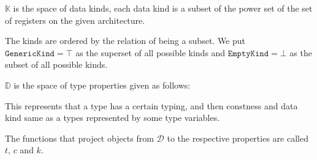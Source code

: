 \begin{defn}
    $\mathbb{K}$ is the space of data kinds, each data kind is a subset of the power set of the set of registers on the given architecture.

    The kinds are ordered by the relation of being a subset. We put $\mathtt{GenericKind} = \top$ as the superset of all possible kinds and $\mathtt{EmptyKind} = \bot$ as the subset of all possible kinds.
\end{defn}

\begin{defn}
    $\mathbb{D}$ is the space of type properties given as follows:

    \begin{algorithmic}
    \end{algorithmic}

    This represents that a type has a certain typing, and then constness and data kind same as a types represented by some type variables.

    The functions that project objects from $\mathcal{D}$ to the respective properties are called $t$, $c$ and $k$.
\end{defn}

